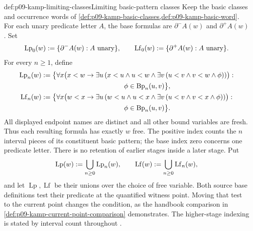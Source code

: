 \begin{hbdefinition}{def:p09-kamp-limiting-classes}{Limiting basic-pattern classes}
Keep the basic classes and occurrence words of
\cref{def:p09-kamp-basic-classes,def:p09-kamp-basic-word}.
For each unary predicate letter \(A\), the base formulas are
\(\partial^-A(w)\) and \(\partial^+A(w)\).  Set
\[
 \operatorname{Lp}_0(w)\mathrel{:=}\{\partial^-A(w):A\text{ unary}\},
 \qquad
 \operatorname{Lf}_0(w)\mathrel{:=}\{\partial^+A(w):A\text{ unary}\}.
\]
For every \(n\geq1\), define
\[
\begin{split}
 \operatorname{Lp}_n(w)\defeq\bigl\{
  &\forall x\bigl(x<w\to\exists u\,
     (x<u\land u<w\land\exists v\,
       (u<v\land v<w\land\phi))\bigr):\\
  &\hspace{35mm}\phi\in\operatorname{Bp}_n(u,v)\bigr\},\\
 \operatorname{Lf}_n(w)\defeq\bigl\{
  &\forall x\bigl(w<x\to\exists u\,
     (w<u\land u<x\land\exists v\,
       (u<v\land v<x\land\phi))\bigr):\\
  &\hspace{35mm}\phi\in\operatorname{Bp}_n(u,v)\bigr\}.
\end{split}
\]
All displayed endpoint names are distinct and all other bound variables are
fresh.  Thus each resulting formula has exactly \(w\) free.  The positive
index counts the \(n\) interval pieces of its constituent basic pattern;
the base index zero concerns one predicate letter.  There is no retention
of earlier stages inside a later stage.  Put
\[
 \operatorname{Lp}(w)\mathrel{:=}\bigcup_{n\geq0}\operatorname{Lp}_n(w),
 \qquad
 \operatorname{Lf}(w)\mathrel{:=}\bigcup_{n\geq0}\operatorname{Lf}_n(w),
\]
and let \(\operatorname{Lp},\operatorname{Lf}\) be their unions over the
choice of free variable.  Both source base definitions test their predicate
at the quantified witness point.  Moving that test to the current point
changes the condition, as the handbook comparison in
\cref{def:p09-kamp-current-point-comparison} demonstrates.
The higher-stage indexing is stated by interval count throughout
\cite[ch.~III, pp.~63, 66--67, 70--72]{Kamp1968}.
\end{hbdefinition}

